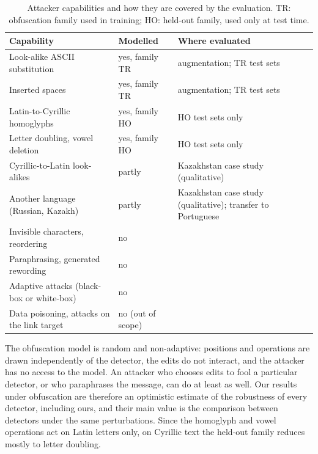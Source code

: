 \begin{table}[H]
\caption{Attacker capabilities and how they are covered by the evaluation. TR: obfuscation family used in training; HO: held-out family, used only at test time.\label{tab:threat}}
\begin{tabularx}{\textwidth}{L L L}
\toprule
\textbf{Capability} & \textbf{Modelled} & \textbf{Where evaluated}\\
\midrule
Look-alike ASCII substitution & yes, family TR & augmentation; TR test sets\\
Inserted spaces & yes, family TR & augmentation; TR test sets\\
Latin-to-Cyrillic homoglyphs & yes, family HO & HO test sets only\\
Letter doubling, vowel deletion & yes, family HO & HO test sets only\\
Cyrillic-to-Latin look-alikes & partly & Kazakhstan case study (qualitative)\\
Another language (Russian, Kazakh) & partly & Kazakhstan case study (qualitative); transfer to Portuguese\\
Invisible characters, reordering & no & \\
Paraphrasing, generated rewording & no & \\
Adaptive attacks (black-box or white-box) & no & \\
Data poisoning, attacks on the link target & no (out of scope) & \\
\bottomrule
\end{tabularx}
\end{table}

The obfuscation model is random and non-adaptive: positions and operations are drawn independently of the detector, the edits do not interact, and the attacker has no access to the model. An attacker who chooses edits to fool a particular detector, or who paraphrases the message, can do at least as well. Our results under obfuscation are therefore an optimistic estimate of the robustness of every detector, including ours, and their main value is the comparison between detectors under the same perturbations. Since the homoglyph and vowel operations act on Latin letters only, on Cyrillic text the held-out family reduces mostly to letter doubling.
